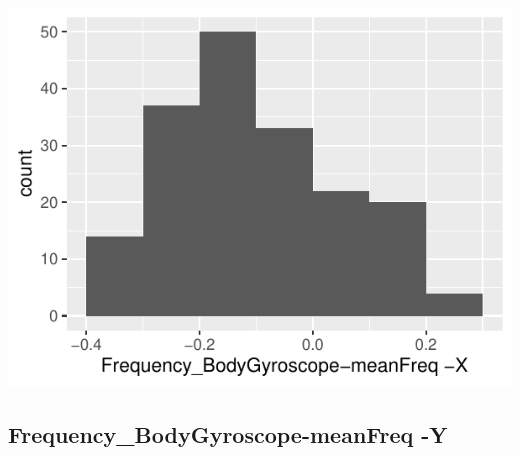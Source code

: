 \documentclass[
]{article}
\begin{document}
\begin{minipage}{0.25 \textwidth}

\includegraphics{codebook_tidydatasub_files/figure-latex/Var-67-Frequency-BodyGyroscope-meanFreq--X-1.pdf}

\end{minipage}

\noindent\makebox[\linewidth]{\rule{\textwidth}{0.4pt}}

\hypertarget{frequency_bodygyroscope-meanfreq--y}{%
\subsection{Frequency\_BodyGyroscope-meanFreq
-Y}\label{frequency_bodygyroscope-meanfreq--y}}
\end{document}

